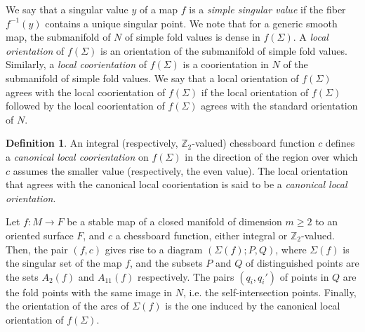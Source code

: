 \documentclass[12pt]{amsart}
\def \Z{\mathbb{Z}}
\def\co{\colon}
\theoremstyle{definition}
\newtheorem{definition}[theorem]{Definition}
\begin{document}
We say that a singular value $y$ of a map $f$ is a  \emph{simple singular value} if the fiber $f^{-1}(y)$ contains a unique singular point. We note that for a generic smooth map,  the submanifold of $N$ of simple fold values is dense in $f(\Sigma)$. A \emph{local orientation} of $f(\Sigma)$ is an orientation of the submanifold of simple fold values.  Similarly, a \emph{local coorientation} of $f(\Sigma)$ is a coorientation in $N$ of the submanifold of simple fold values. We say that a local orientation of $f(\Sigma)$ agrees with the local coorientation of $f(\Sigma)$ if the local orientation of $f(\Sigma)$ followed by the local coorientation of $f(\Sigma)$ agrees with the standard orientation of $N$. 
 \begin{definition}
 An integral (respectively, $\Z_2$-valued) chessboard function $c$ defines a \emph{canonical local coorientation} on $f(\Sigma)$ in the direction of the region over which $c$ assumes the smaller value (respectively, the even value).  The local orientation that agrees with the canonical local coorientation is said to be a \emph{canonical local orientation}. 
\end{definition}




Let $f\co M\to F$ be a stable map of a closed manifold of dimension $m\ge 2$ to an oriented surface $F$, and $c$ a chessboard function, either integral or $\Z_2$-valued. Then, the pair $(f,c)$ gives rise to a diagram $(\Sigma(f); P, Q)$, where $\Sigma(f)$ is the singular set of the map $f$,  and the subsets $P$ and $Q$ of distinguished points are the sets $A_2(f)$ and $A_{11}(f)$ respectively. The pairs $(q_i, q_i')$ of points in $Q$ are the fold points with the same image in $N$, i.e. the self-intersection points.  Finally,  the orientation of the arcs of $\Sigma(f)$ is the one induced by the canonical local orientation of $f(\Sigma)$. 
\end{document}
